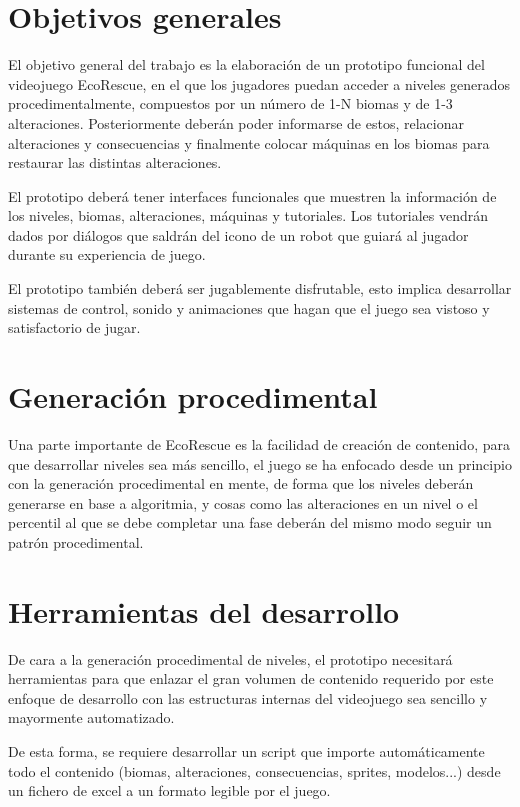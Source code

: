 \section*{Objetivos generales}
El objetivo general del trabajo es la elaboración de un prototipo funcional del videojuego EcoRescue, en el que los jugadores puedan acceder a niveles generados procedimentalmente, compuestos por un número de 1-N biomas y de 1-3 alteraciones. Posteriormente deberán poder informarse de estos, relacionar alteraciones y consecuencias y finalmente colocar máquinas en los biomas para restaurar las distintas alteraciones.

El prototipo deberá tener interfaces funcionales que muestren la información de los niveles, biomas, alteraciones, máquinas y tutoriales. Los tutoriales vendrán dados por diálogos que saldrán del 
icono de un robot que guiará al jugador durante su experiencia de juego.

El prototipo también deberá ser jugablemente disfrutable, esto implica desarrollar sistemas de control, sonido y animaciones que hagan que el juego sea vistoso y satisfactorio de jugar.

\section*{Generación procedimental}

Una parte importante de EcoRescue es la facilidad de creación de contenido, para que desarrollar niveles sea más sencillo, el juego se ha enfocado desde un principio con la generación procedimental en mente, de forma que los niveles deberán generarse en base a algoritmia\cite{FastNoiseLite}, y cosas como las alteraciones en un nivel o el percentil al que se debe completar una fase deberán del mismo modo seguir un patrón procedimental.

\section*{Herramientas del desarrollo}

De cara a la generación procedimental de niveles, el prototipo necesitará herramientas para que enlazar el gran volumen de contenido requerido por este enfoque de desarrollo con las estructuras internas del videojuego sea sencillo y mayormente automatizado. 

De esta forma, se requiere desarrollar un script que importe automáticamente todo el contenido (biomas, alteraciones, consecuencias, sprites, modelos...) desde un fichero de excel a un formato legible por el juego.

